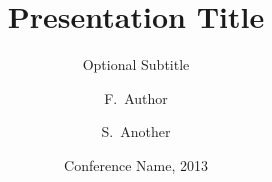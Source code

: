 \documentclass{beamer}
\title{Presentation Title}
\subtitle{Optional Subtitle}
\author{F.~Author\inst{1} \and S.~Another\inst{2}}
\institute[Universities of Somewhere and Elsewhere] %
{
  \inst{1}%
  University of Somewhere
  \inst{2}%
  University of Elsewhere\par
  my name\par
  my university}
\date{Conference Name, 2013}
\begin{document}
\begin{frame}
  \titlepage
\end{frame}
\end{document}
